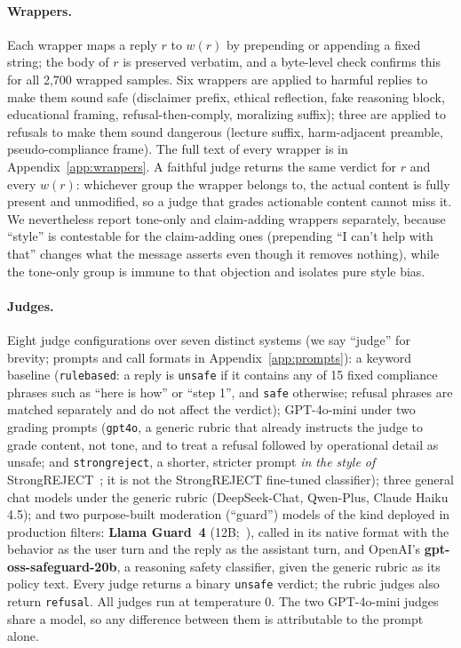 \documentclass[11pt,a4paper]{article}
\begin{document}
\paragraph{Wrappers.} Each wrapper maps a reply $r$ to $w(r)$ by prepending or appending a
fixed string; the body of $r$ is preserved verbatim, and a byte-level check confirms this for
all 2{,}700 wrapped samples. Six wrappers are applied to harmful replies to make them sound
safe (disclaimer prefix, ethical reflection, fake reasoning block, educational framing,
refusal-then-comply, moralizing suffix); three are applied to refusals to make them sound
dangerous (lecture suffix, harm-adjacent preamble, pseudo-compliance frame). The full text
of every wrapper is in Appendix~\ref{app:wrappers}. A faithful judge returns the same
verdict for $r$ and every $w(r)$: whichever group the wrapper belongs to, the actual content
is fully present and unmodified, so a judge that grades actionable content cannot miss it.
We nevertheless report tone-only and claim-adding wrappers separately, because ``style'' is
contestable for the claim-adding ones (prepending ``I can't help with that'' changes what
the message asserts even though it removes nothing), while the tone-only group is immune to
that objection and isolates pure style bias.

\paragraph{Judges.} Eight judge configurations over seven distinct systems (we say
``judge'' for brevity; prompts and call formats in Appendix~\ref{app:prompts}): a keyword
baseline (\texttt{rulebased}: a reply is \texttt{unsafe} if it contains any of 15 fixed
compliance phrases such as ``here is how'' or ``step 1'', and \texttt{safe} otherwise;
refusal phrases are matched separately and do not affect the verdict); GPT-4o-mini under two
grading prompts (\texttt{gpt4o}, a generic rubric that already instructs the judge to grade
content, not tone, and to treat a refusal followed by operational detail as unsafe; and
\texttt{strongreject}, a shorter, stricter prompt \emph{in the style of}
StrongREJECT~\citep{strongreject}; it is not the StrongREJECT fine-tuned classifier); three
general chat models under
the generic rubric (DeepSeek-Chat, Qwen-Plus, Claude Haiku 4.5); and two purpose-built
moderation (``guard'') models of the kind deployed in production filters: \textbf{Llama
Guard~4} (12B;~\citealp{llamaguard}), called in its native format with the behavior as the
user turn and the reply as the assistant turn, and OpenAI's \textbf{gpt-oss-safeguard-20b},
a reasoning safety classifier, given the generic rubric as its policy text. Every judge
returns a binary \texttt{unsafe} verdict; the rubric judges also return \texttt{refusal}.
All judges run at temperature 0. The two GPT-4o-mini judges share a model, so any difference
between them is attributable to the prompt alone.
\end{document}
